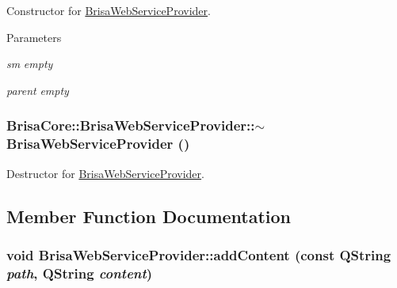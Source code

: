 Constructor for \hyperlink{classBrisaCore_1_1BrisaWebServiceProvider}{BrisaWebServiceProvider}. 
\begin{DoxyParams}{Parameters}
\item[{\em sm}]{\itshape empty\/} \item[{\em parent}]{\itshape empty\/} \end{DoxyParams}
\hypertarget{classBrisaCore_1_1BrisaWebServiceProvider_ae209fc22681c21cfc2745b6f177fe78f}{
\subsubsection[{$\sim$BrisaWebServiceProvider}]{\setlength{\rightskip}{0pt plus 5cm}BrisaCore::BrisaWebServiceProvider::$\sim$BrisaWebServiceProvider ()}}
\label{classBrisaCore_1_1BrisaWebServiceProvider_ae209fc22681c21cfc2745b6f177fe78f}


Destructor for \hyperlink{classBrisaCore_1_1BrisaWebServiceProvider}{BrisaWebServiceProvider}. 

\subsection{Member Function Documentation}
\hypertarget{classBrisaCore_1_1BrisaWebServiceProvider_a916815911d9293464bf7a2545f46cbfd}{
\subsubsection[{addContent}]{\setlength{\rightskip}{0pt plus 5cm}void BrisaWebServiceProvider::addContent (const QString {\em path}, \/  QString {\em content})}}
\label{classBrisaCore_1_1BrisaWebServiceProvider_a916815911d9293464bf7a2545f46cbfd}


